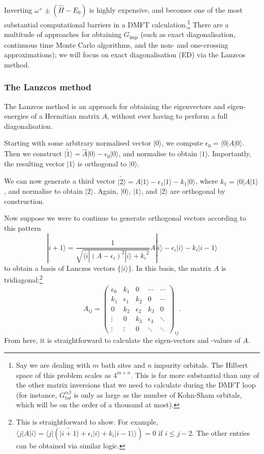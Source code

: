 \documentclass[10pt,a4paper,final]{article}
\newcommand{\bra}[1]{\langle #1|}
\newcommand{\ket}[1]{|#1\rangle}
\begin{document}
Inverting $\omega^+\pm(\hat H - E_0)$ is highly expensive, and becomes one of the most substantial computational barriers in a DMFT calculation.\footnote{Say we are dealing with $m$ bath sites and $n$ impurity orbitals. The Hilbert space of this problem scales as $4^{m+n}$. This is far more substantial than any of the other matrix inversions that we need to calculate during the DMFT loop (for instance, $G^{\alpha\beta}_{tot}$ is only as large as the number of Kohn-Sham orbitals, which will be on the order of a thousand at most).} There are a multitude of approaches for obtaining  $G_\text{imp}$ (such as exact diagonalisation, continuous time Monte Carlo algorithms, and the non- and one-crossing approximations); we will focus on exact diagonalisation (ED) via the Lanzcos method.

\subsubsection{The Lanzcos method}
The Lanzcos method is an approach for obtaining the eigenvectors and eigen-energies of a Hermitian matrix $A$, without ever having to perform a full diagonalisation.

Starting with some arbitrary normalised vector $\ket{0}$, we compute $\epsilon_0 = \bra{0}A \ket{0}$. Then we construct $\tilde{\ket{1}} = \hat A\ket{0}-\epsilon_0 \ket{0}$, and normalise to obtain $\ket{1}$. Importantly, the resulting vector $\ket{1}$ is orthogonal to $\ket{0}$.

We can now generate a third vector $\tilde{\ket{2}} = A\ket{1}-\epsilon_1\ket{1} - k_1\ket{0}$, where $k_1 = \bra{0}A \ket{1}$, and normalise to obtain $\ket{2}$. Again, $\ket{0}$, $\ket{1}$, and $\ket{2}$ are orthogonal by construction.

Now suppose we were to continue to generate orthogonal vectors according to this pattern 
%
\begin{equation}
\ket{i+1} = \frac{1}{\sqrt{\bra{i}(A - \epsilon_i)^2\ket{i} + {k_i}^2}} A \ket{i} - \epsilon_i\ket{i} -k_i \ket{i-1}
\end{equation}
%
to obtain a basis of Lanczos vectors $\{\ket{i}\}$. In this basis, the matrix $A$ is tridiagonal:\footnote{This is straightforward to show. For example, $ \bra{j}A\ket{i} = \bra{j}\left( \tilde{\ket{i+1}}+\epsilon_i\ket{i}+k_i\ket{i-1}\rangle \right) = 0$ if $i \leq j-2 $. The other entries can be obtained via similar logic.}
%
\begin{equation}
A_{ij} = \begin{pmatrix}
\epsilon_0 & k_1        & 0          & \cdots     & \cdots \\
k_1        & \epsilon_1 & k_2        & 0          & \cdots \\
0          & k_2        & \epsilon_2 & k_3        & 0      \\
\vdots     & 0          & k_3        & \epsilon_3 & \ddots \\
\vdots     & \vdots     & 0          & \ddots     & \ddots
\end{pmatrix}_{ij}.
\end{equation}
%
From here, it is straightforward to calculate the eigen-vectors and -values of $A$.
\end{document}
